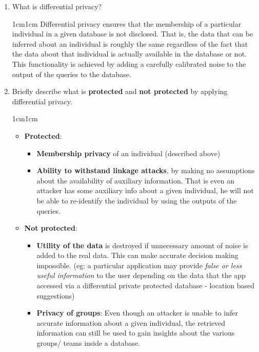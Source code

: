 \documentclass[11pt,letterpaper]{article}
\newenvironment{answer}{\em \color{blue} \begin{adjustwidth}{1cm}{1cm}}{\end{adjustwidth}}
\begin{document}
	\begin{enumerate}
		
		\item What is differential privacy?
		
		\begin{answer}
			Differential privacy ensures that the membership of a particular individual in a given database is not disclosed. That is, the data that can be inferred about an individual is roughly the same regardless of the fact that the data about that individual is actually available in the database or not. This functionality is achieved by adding a carefully calibrated noise to the output of the queries to the database.
		\end{answer}
		
		\item Briefly describe what is \textbf{protected} and \textbf{not protected} by applying differential privacy.
		
		\begin{answer}
			\begin{itemize}
				\item \textbf{\sc Protected}:
				\begin{itemize}
					\item \textbf{Membership privacy} of an individual (described above)
					
					\item \textbf{Ability to withstand linkage attacks}, by making no assumptions about the availability of auxiliary information. That is even an attacker has some auxiliary info about a given individual, he will not be able to re-identify the individual by using the outputs of the queries.					
				\end{itemize} 
				
				\item \textbf{\sc Not protected}:
				\begin{itemize}
					\item \textbf{Utility of the data} is destroyed if unnecessary amount of noise is added to the real data. This can make accurate decision making impossible. (eg: a particular application may provide \textit{false or less useful information} to the user depending on the data that the app accessed via a differential private protected database - location based suggestions)
					
					\item \textbf{Privacy of groups}: Even though an attacker is unable to infer accurate information about a given individual, the retrieved information can still be used to gain insights about the various groups/ teams inside a database.
				\end{itemize}
				

\end{itemize}
\end{answer}
\end{enumerate}
\end{document}

